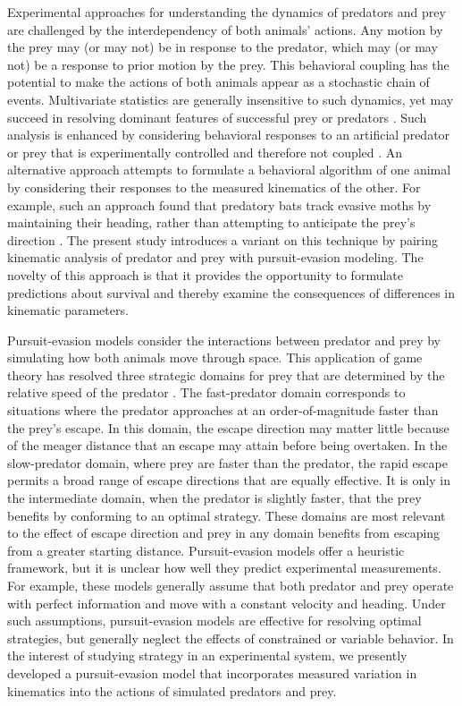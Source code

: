 \documentclass[]{rsos}%
\begin{document}
Experimental approaches for understanding the dynamics of predators and prey are challenged by the interdependency of both animals' actions.
Any motion by the prey may (or may not) be in response to the predator, which may (or may not) be a response to prior motion by the prey. 
This behavioral coupling has the potential to make the actions of both animals appear as a stochastic chain of events.
Multivariate statistics are generally insensitive to such dynamics, yet may succeed in resolving dominant features of successful prey \cite{Walker:2005vn} or predators \cite{Wainwright:2001ufa}.
Such analysis is enhanced by considering behavioral responses to an artificial predator or prey that is experimentally controlled and therefore not coupled \cite{Gabbiani:1999wz,Stewart:2014cma,Heuch:2007kk}.
An alternative approach attempts to formulate a behavioral algorithm of one animal by considering their responses to the measured kinematics of the other.
For example, such an approach found that predatory bats track evasive moths by maintaining their heading, rather than attempting to anticipate the prey's direction \cite{Ghose:2006dk}. 
The present study introduces a variant on this technique by pairing kinematic analysis of predator and prey with pursuit-evasion modeling.
The novelty of this approach is that it provides the opportunity to formulate predictions about survival and thereby examine the consequences of differences in kinematic parameters.

Pursuit-evasion models consider the interactions between predator and prey by simulating how both animals move through space.
This application of game theory has resolved three strategic domains for prey that are determined by the relative speed of the predator \cite{Gal:2014ve,Weihs:1984tb, Soto:2015cj}.
The fast-predator domain corresponds to situations where the predator approaches at an order-of-magnitude faster than the prey's escape.
In this domain, the escape direction may matter little because of the meager distance that an escape may attain before being overtaken.
In the slow-predator domain, where prey are faster than the predator, the rapid escape permits a broad range of escape directions that are equally effective.
It is only in the intermediate domain, when the predator is slightly faster, that the prey benefits by conforming to an optimal strategy.
These domains are most relevant to the effect of escape direction and prey in any domain benefits from escaping from a greater starting distance.
Pursuit-evasion models offer a heuristic framework, but it is unclear how well they predict experimental measurements. 
For example, these models generally assume that both predator and prey operate with perfect information and move with a constant velocity and heading.
Under such assumptions, pursuit-evasion models are effective for resolving optimal strategies, but generally neglect the effects of constrained or variable behavior.
In the interest of studying strategy in an experimental system, we presently developed a pursuit-evasion model that incorporates measured variation in kinematics into the actions of simulated predators and prey. 
\end{document}
